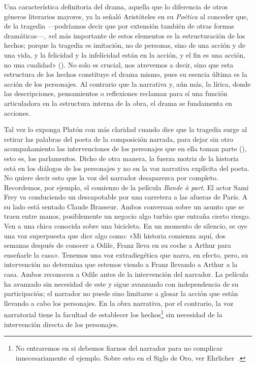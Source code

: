 Una característica definitoria del drama, aquella que lo diferencia de otros géneros literarios mayores, ya la señaló Aristóteles en su \textit{Poética} al conceder que, de la tragedia —\nolinebreak podríamos decir que por extensión también de otras formas dramáticas\nolinebreak—\nolinebreak, «el más importante de estos elementos es la estructuración de los hechos; porque la tragedia es imitación, no de personas, sino de una acción y de una vida, y la felicidad y la infelicidad están en la acción, y el fin es una acción, no una cualidad» (). No solo es crucial, nos atrevemos a decir, sino que esta estructura de los hechos constituye el drama mismo, pues su esencia última es la acción de los personajes. Al contrario que la narrativa y, aún más, la lírica, donde las descripciones, pensamientos o reflexiones reclaman para sí una función articuladora en la estructura interna de la obra, el drama se fundamenta en acciones.

Tal vez lo exponga Platón con más claridad cuando dice que la tragedia surge al retirar las palabras del poeta de la composición narrada, para dejar sin otro acompañamiento las intervenciones de los personajes que en ella toman parte (), esto es, los parlamentos. Dicho de otra manera, la fuerza motriz de la historia está en los diálogos de los personajes y no en la voz narrativa explícita del poeta. No quiere decir esto que la voz del narrador desaparezca por completo. Recordemos, por ejemplo, el comienzo de la película \textit{Bande à part}. El actor Sami Frey va conduciendo un descapotable por una carretera a las afueras de París. A su lado está sentado Claude Brasseur. Ambos conversan sobre un asunto que se traen entre manos, posiblemente un negocio algo turbio que entraña cierto riesgo. Ven a una chica conocida sobre una bicicleta. En un momento de silencio, se oye una voz superpuesta que dice algo como: «Mi historia comienza aquí, dos semanas después de conocer a Odile, Franz lleva en su coche a Arthur para enseñarle la casa». Tenemos una voz extradiegética que narra, en efecto, pero, su intervención no determina que estemos viendo a Franz llevando a Arthur a la casa. Ambos reconocen a Odile antes de la intervención del narrador. La película ha avanzado sin necesidad de este y sigue avanzando con independencia de su participación; el narrador no puede sino limitarse a glosar la acción que están llevando a cabo los personajes. En la obra narrativa, por el contrario, la voz narratorial tiene la facultad de establecer los hechos\footnote{No entraremos en si debemos fiarnos del narrador para no complicar innecesariamente el ejemplo. Sobre esto en el Siglo de Oro, ver Ehrlicher~\parencite*{ehrlicher2021}.} sin necesidad de la intervención directa de los personajes.

